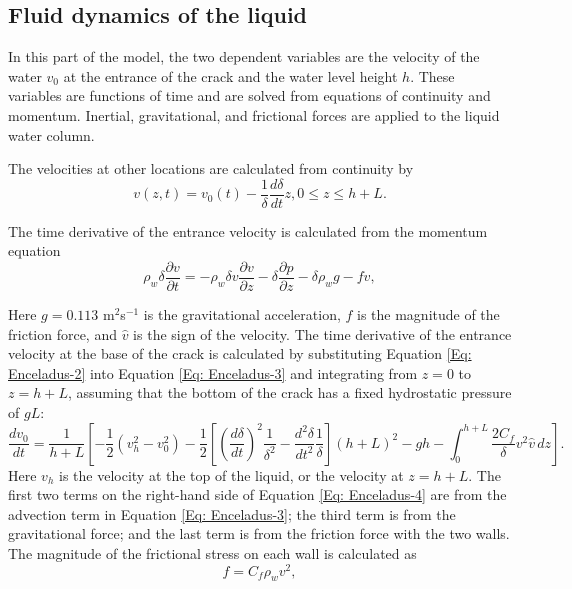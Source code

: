 \documentclass[draft]{agujournal2019}
\begin{document}
\subsection{Fluid dynamics of the liquid}
In this part of the model, the two dependent variables are the velocity of the water $v_0$ at the entrance of the crack and the water level height $h$. These variables are functions of time and are solved from equations of continuity and momentum. Inertial, gravitational, and frictional forces are applied to the liquid water column.

The velocities at other locations are calculated from continuity by
\begin{equation}
    v(z,t)=v_0(t)-\frac{1}{\delta}\frac{d\delta}{dt}z, 0\leq z \leq h+L.
    \label{Eq: Enceladus-2}
\end{equation}

The time derivative of the entrance velocity is calculated from the momentum equation
\begin{equation}
    \rho_w \delta \frac{\partial v}{\partial t} = -\rho_w \delta v \frac{\partial v}{\partial z} - \delta \frac{\partial p}{\partial z} - \delta \rho_w g - f \hat{v},
    \label{Eq: Enceladus-3}
\end{equation}

Here $g=0.113$ m$^2$s$^{-1}$ is the gravitational acceleration, $f$ is the magnitude of the friction force, and $\hat{v}$ is the sign of the velocity. The time derivative of the entrance velocity at the base of the crack is calculated by substituting Equation \ref{Eq: Enceladus-2} into Equation \ref{Eq: Enceladus-3} and integrating from $z = 0$ to $z = h + L$, assuming that the bottom of the crack has a fixed hydrostatic pressure of $gL$:
\begin{equation}
    \frac{dv_0}{dt} = \frac{1}{h+L} \left[ -\frac{1}{2} \left( v_h^2 - v_0^2 \right)
- \frac{1}{2} \left[ \left( \frac{d\delta}{dt} \right)^2 \frac{1}{\delta^2} - \frac{d^2\delta}{dt^2} \frac{1}{\delta} \right] (h+L)^2
- gh - \int_0^{h+L} \frac{2C_f}{\delta} v^2 \hat{v} \, dz \right].
\label{Eq: Enceladus-4}
\end{equation}
Here $v_h$ is the velocity at the top of the liquid, or the velocity at $z=h+L$. The first two terms on the right-hand side of Equation \ref{Eq: Enceladus-4} are from the advection term in Equation \ref{Eq: Enceladus-3}; the third term is from the gravitational force; and the last term is from the friction force with the two walls. The magnitude of the frictional stress on each wall is calculated as
\begin{equation}
    f=C_f\rho_w v^2,
\end{equation}
\end{document}

